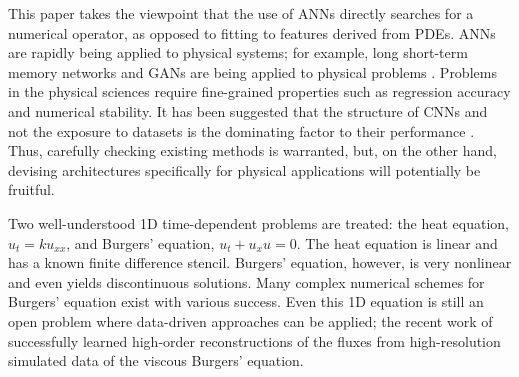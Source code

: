 \documentclass{article}
\begin{document}



This paper takes the viewpoint that the use of ANNs directly
searches for a numerical operator, as opposed to fitting to features
derived from PDEs.
ANNs are rapidly being applied to physical systems; for example, long
short-term memory networks \citep{vlachas_data-driven_2018}
and GANs are
being applied to physical problems \citep{xie_tempogan:_2018,wu_physics-informed_2018,werhahn_multi-pass_2019} . 
Problems in the physical sciences require fine-grained properties such as regression accuracy and numerical stability.
It has been suggested that the structure of CNNs and not the
exposure to datasets is the dominating factor to their performance
\citep{ulyanov_deep_2018,zador_critique_2019}. Thus, carefully
checking existing methods is warranted, but, on the other hand, devising
architectures specifically for physical applications will potentially be fruitful.


Two well-understood 1D time-dependent problems are treated:
the heat equation, $u_{t} = k u_{xx}$, 
and Burgers' equation,  $u_{t} + u_x u = 0$. The heat equation is linear and has a 
known finite difference stencil. Burgers' equation, however, is very
nonlinear and even yields discontinuous solutions. Many complex numerical schemes for Burgers' equation
exist with various success.
Even this 1D equation is still an open problem where data-driven
approaches can be applied; the recent work of
\citet{bar-sinai_data-driven_2018} successfully learned high-order
reconstructions of the fluxes from high-resolution simulated data of the viscous
Burgers' equation.



\end{document}
